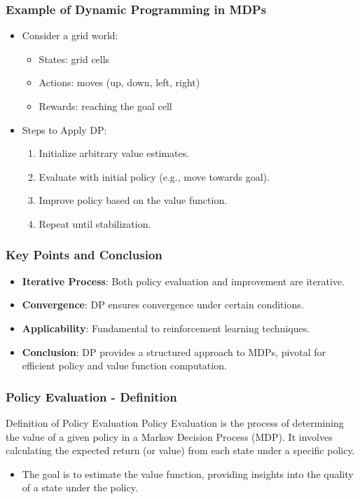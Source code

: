 \documentclass[aspectratio=169]{beamer}
\begin{document}
\begin{frame}[fragile]
    \frametitle{Example of Dynamic Programming in MDPs}
    \begin{itemize}
        \item Consider a grid world:
        \begin{itemize}
            \item States: grid cells
            \item Actions: moves (up, down, left, right)
            \item Rewards: reaching the goal cell
        \end{itemize}
        \item Steps to Apply DP:
        \begin{enumerate}
            \item Initialize arbitrary value estimates.
            \item Evaluate with initial policy (e.g., move towards goal).
            \item Improve policy based on the value function.
            \item Repeat until stabilization.
        \end{enumerate}
    \end{itemize}
\end{frame}

\begin{frame}[fragile]
    \frametitle{Key Points and Conclusion}
    \begin{itemize}
        \item \textbf{Iterative Process}:
        Both policy evaluation and improvement are iterative.
        
        \item \textbf{Convergence}:
        DP ensures convergence under certain conditions.
        
        \item \textbf{Applicability}:
        Fundamental to reinforcement learning techniques.
        
        \item \textbf{Conclusion}:
        DP provides a structured approach to MDPs, pivotal for efficient policy and value function computation.
    \end{itemize}
\end{frame}

\begin{frame}[fragile]
    \frametitle{Policy Evaluation - Definition}
    \begin{block}{Definition of Policy Evaluation}
        Policy Evaluation is the process of determining the value of a given policy in a Markov Decision Process (MDP). It involves calculating the expected return (or value) from each state under a specific policy.
    \end{block}
    
    \begin{itemize}
        \item The goal is to estimate the value function, providing insights into the quality of a state under the policy.
    \end{itemize}
\end{frame}
\end{document}
